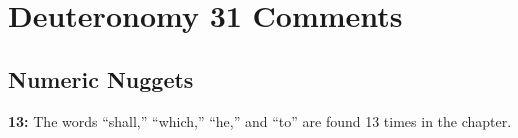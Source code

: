 \section{Deuteronomy 31 Comments}

\subsection{Numeric Nuggets}
\textbf{13:} The words ``shall,'' ``which,'' ``he,'' and ``to'' are found 13 times in the chapter.